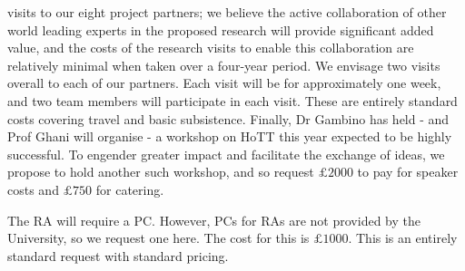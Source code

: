 \documentclass[a4paper,11pt]{article}
\begin{document}
visits to our eight project partners; we believe the active
collaboration of other world leading experts in the proposed research
will provide significant added value, and the costs of the research
visits to enable this collaboration are relatively minimal when taken
over a four-year period. We envisage two visits overall to each of our
partners. Each visit will be for approximately one week, and two team
members will participate in each visit.
These are entirely standard costs covering travel and basic
subsistence. Finally, Dr Gambino has held - and Prof Ghani will organise - a workshop on HoTT
this year expected to be highly successful. To engender greater impact and
facilitate the exchange of ideas, we propose to hold another such
workshop, and so request $\pounds 2000$ to pay for speaker costs and
$\pounds 750$ for catering.

\vspace{0.02in}

 The RA will require a PC. However, PCs
for RAs are not provided by the University, so we request one
here. The cost for this is $\pounds 1000$. This is an entirely
standard request with standard pricing.
\end{document}
